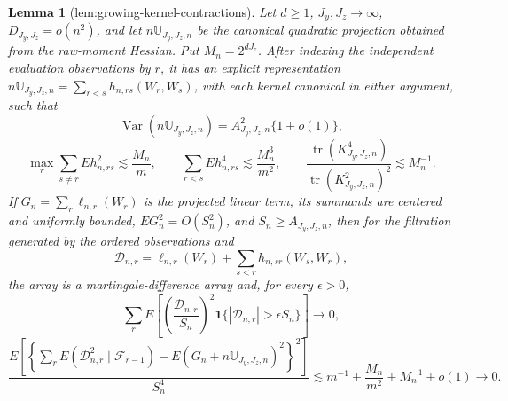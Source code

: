 \documentclass{article}
\newtheorem{lemma}{Lemma}
\begin{document}
\begin{lemma}[lem:growing-kernel-contractions]\label{lem:growing-kernel-contractions}
Let \(d\ge1\), \(J_y,J_z\to\infty\), \(D_{J_y,J_z}=o(n^2)\), and let \(n\mathbb U_{J_y,J_z,n}\) be the canonical quadratic projection obtained from the raw-moment Hessian. Put \(M_n=2^{dJ_z}\). After indexing the independent evaluation observations by \(r\), it has an explicit representation \(n\mathbb U_{J_y,J_z,n}=\sum_{r<s}h_{n,rs}(W_r,W_s)\), with each kernel canonical in either argument, such that
\[
\operatorname{Var}(n\mathbb U_{J_y,J_z,n})=A_{J_y,J_z,n}^2\{1+o(1)\},
\]
\[
\max_r\sum_{s\ne r}E h_{n,rs}^2\lesssim \frac{M_n}{m},
\qquad
\sum_{r<s}E h_{n,rs}^4\lesssim\frac{M_n^3}{m^2},
\qquad
\frac{\operatorname{tr}(K_{J_y,J_z,n}^4)}{\operatorname{tr}(K_{J_y,J_z,n}^2)^2}\lesssim M_n^{-1}.
\]
If \(G_n=\sum_r\ell_{n,r}(W_r)\) is the projected linear term, its summands are centered and uniformly bounded, \(E G_n^2=O(S_n^2)\), and \(S_n\ge A_{J_y,J_z,n}\), then for the filtration generated by the ordered observations and
\[
\mathcal D_{n,r}=\ell_{n,r}(W_r)+\sum_{s<r}h_{n,sr}(W_s,W_r),
\]
the array is a martingale-difference array and, for every \(\epsilon>0\),
\[
\sum_rE\left[\left(\frac{\mathcal D_{n,r}}{S_n}\right)^2
\mathbf 1\{|\mathcal D_{n,r}|>\epsilon S_n\}\right]\to0,
\]
\[
\frac{E\left[\left\{\sum_rE(\mathcal D_{n,r}^2\mid\mathcal F_{r-1})-E(G_n+n\mathbb U_{J_y,J_z,n})^2\right\}^2\right]}{S_n^4}
\lesssim m^{-1}+\frac{M_n}{m^2}+M_n^{-1}+o(1)\to0.
\]
\end{lemma}
\end{document}
